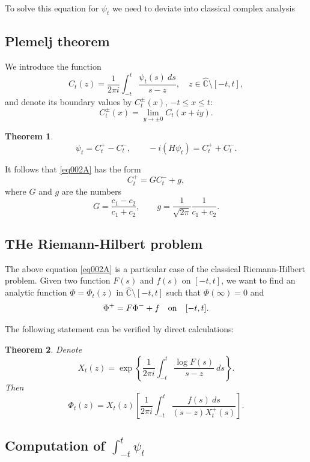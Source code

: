 \documentclass[11pt,twoside,reqno]{amsart}
\def\to{\rightarrow}
\def\ms{\bigskip}
\def\ms{\medskip}
\def\no{\noindent}
\theoremstyle{plain}
\newtheorem{theorem}{Theorem}
\numberwithin{equation}{section}
\begin{document}
To solve this equation for $\psi_t$ we need to deviate into classical complex analysis

\ms\subsection{Plemelj theorem} We introduce the function
\begin{equation}C_t(z)=\frac1{2\pi i}\int_{-t}^t\frac{\psi_t(s)~ds}{s-z},
\quad z\in \hat{\mathbb C}\setminus [-t,t],\label{eq002}\end{equation}
and denote its boundary values by
$C^\pm_t(x)$, $-t\le x\le t$:
$$C^\pm_t(x)=\lim_{y\to\pm 0}C_t(x+iy).$$ 

\begin{theorem}
$$\psi_t=C^+_t-C^-_t,\qquad -i(H\psi_t)=C^+_t+C^-_t.$$
\end{theorem}

\ms\no It follows that \eqref{eq002A} has the form
\begin{equation}
	C^+_t=GC^-_t+g,\label{eq001}
\end{equation}
where $G$ and $g$ are the numbers
$$G=\frac{c_1-c_2}{c_1+c_2},\qquad g=\frac1{\sqrt{2\pi }}\frac1{c_1+c_2}.$$
   
\ms\subsection{THe Riemann-Hilbert problem} 
The above equation \eqref{eq002A} is a particular case of the classical Riemann-Hilbert problem.
Given two function $F(s)$ and $f(s)$ on $[-t,t]$, we want to find an analytic function $\Phi=\Phi_t(z)$ in $\hat{\mathbb C}\setminus [-t,t]$
such that $\Phi(\infty)=0$ and
$$\Phi^+=F\Phi^-+f\quad {\rm on}\quad [-t,t].$$

The following statement can be verified by direct calculations:

\begin{theorem} Denote 
\begin{equation}X_t(z)=\exp\left\{\frac1{2\pi i}\int_{-t}^t\frac{\log F(s)}{s-z}~ds\right\}.\label{eq003}\end{equation}
Then
\begin{equation}\Phi_t(z)=X_t(z)\left[\frac1{2\pi i}\int_{-t}^t\frac{f(s)~ds}{(s-z) X_t^+(s)}        \right].\label{eq004}\end{equation}
\end{theorem}

\ms\subsection{Computation of $\int_{-t}^t\psi_t$}  
\end{document}
